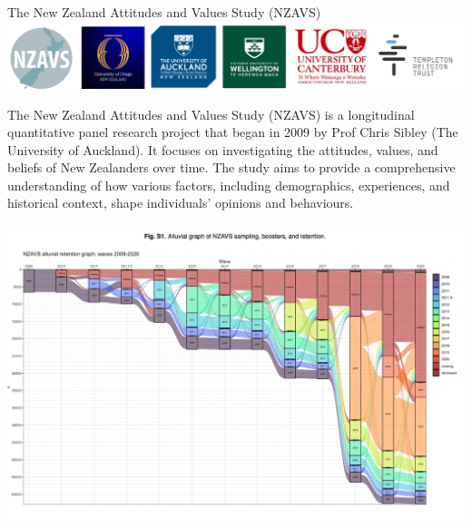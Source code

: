 \documentclass[
  ignorenonframetext,
  aspectratio=169,
]{beamer}
\begin{document}
\begin{frame}{The New Zealand Attitudes and Values Study (NZAVS)}
\label{the-new-zealand-attitudes-and-values-study-nzavs}
\includegraphics{figs/sponsors.png}
\end{frame}

\begin{frame}
The New Zealand Attitudes and Values Study (NZAVS) is a longitudinal
quantitative panel research project that began in 2009 by Prof Chris
Sibley (The University of Auckland). It focuses on investigating the
attitudes, values, and beliefs of New Zealanders over time. The study
aims to provide a comprehensive understanding of how various factors,
including demographics, experiences, and historical context, shape
individuals' opinions and behaviours.
\end{frame}

\begin{frame}
\includegraphics{figs/alluvial.png}
\end{frame}
\end{document}

